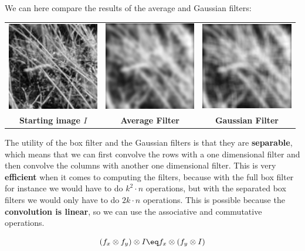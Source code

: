 We can here compare the results of the average and Gaussian filters:
\begin{center}
    \footnotesize
    \begin{tabular}{c c c}
        \includegraphics[width = 4cm]{imgs/004.jpg} & \includegraphics[width = 4cm]{imgs/005.jpg} & \includegraphics[width = 4cm]{imgs/006.jpg} \\
        \textbf{Starting image $I$} & \textbf{Average Filter} & \textbf{Gaussian Filter}
    \end{tabular}
\end{center}

The utility of the box filter and the Gaussian filters is that they are \textbf{separable}, which means that we can first convolve the rows with a one dimensional filter and then convolve the columns with another one dimensional filter. This is very \textbf{efficient} when it comes to computing the filters, because with the full box filter for instance we would have to do $k^2 \cdot n$ operations, but with the separated box filters we would only have to do $2k \cdot n$ operations. This is possible because the \textbf{convolution is linear}, so we can use the associative and commutative operations.

\[ (f_x \otimes f_y) \otimes I \eq f_x \otimes (f_y \otimes I) \]

